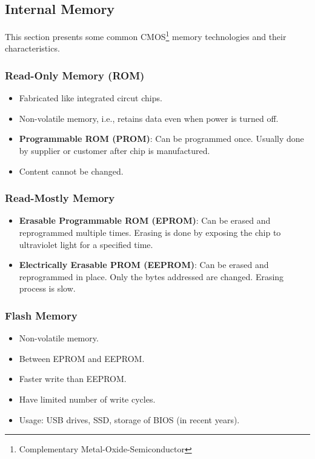 \subsection{Internal Memory}

This section presents some common CMOS\footnote{Complementary Metal-Oxide-Semiconductor} memory
technologies and their characteristics.

\subsubsection{Read-Only Memory (ROM)}

\begin{itemize}
    \item Fabricated like integrated circut chips.
    \item Non-volatile memory, i.e., retains data even when power is turned off.
    \item \textbf{Programmable ROM (PROM)}: Can be programmed once. Usually done by supplier
        or customer after chip is manufactured.
    \item Content cannot be changed.
\end{itemize}

\subsubsection{Read-Mostly Memory}

\begin{itemize}
    \item \textbf{Erasable Programmable ROM (EPROM)}: Can be erased and reprogrammed multiple times.
        Erasing is done by exposing the chip to ultraviolet light for a specified time.
    \item \textbf{Electrically Erasable PROM (EEPROM)}: Can be erased and reprogrammed in place.
        Only the bytes addressed are changed. Erasing process is slow.
\end{itemize}

\subsubsection{Flash Memory}

\begin{itemize}
    \item Non-volatile memory.
    \item Between EPROM and EEPROM.
    \item Faster write than EEPROM.
    \item Have limited number of write cycles.
    \item Usage: USB drives, SSD, storage of BIOS (in recent years).
\end{itemize}


